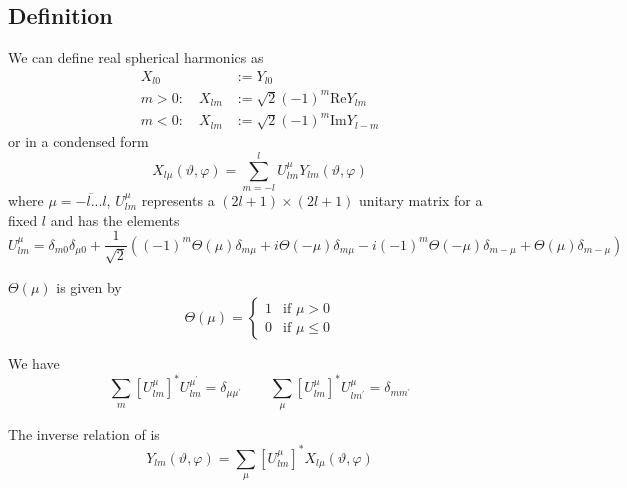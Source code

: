 \subsection{Definition}
\par{We can define real spherical harmonics as}
\begin{equation}
\begin{split}
X_{l0}&:=Y_{l0}\\ m>0:\quad
X_{lm}&:=\sqrt{2}(-1)^m\text{Re}Y_{lm}\\m<0:\quad X_{lm}&:=\sqrt{2}(-1)^m\text{Im}Y_{l-m}
\end{split}\end{equation}
or in a condensed form
\begin{equation}
\label{Rspherdef}
X_{l\mu}(\vartheta,\varphi)=\sum_{m=-l}^{l}U_{lm}^{\mu}Y_{lm}(\vartheta,\varphi)
\end{equation}
where $\mu=\overline{-l...l}$, $U_{lm}^{\mu}$ represents a $(2l+1)\times (2l+1)$
unitary matrix for a fixed $l$ and has the
elements
\begin{equation*}
U_{lm}^{\mu}=\delta_{m0}\delta_{\mu 0}+\frac{1}{\sqrt{2}}\left((-1)^m
  \Theta(\mu)\delta_{m\mu}+i\Theta(-\mu)\delta_{m\mu}-i(-1)^m \Theta(-\mu)\delta_{m-\mu}+\Theta(\mu)\delta_{m-\mu}\right)
\end{equation*}
\par{$\Theta(\mu)$} is given by
\begin{equation}
\Theta(\mu)=\left\{\begin{array}{ll}
1&\textrm{if \(\mu>0\)}\\
0&\textrm{if \(\mu \le 0\)}
\end{array}\right.
\end{equation}
%
\par{We have}
\begin{equation}
\label{unit}
\sum_{m}[U_{lm}^{\mu}]^{*}U_{lm}^{\mu^{\prime}}=\delta_{\mu \mu^{\prime}}\qquad\sum_{\mu}[U_{lm}^{\mu}]^{*}U_{lm^{\prime}}^{\mu}=\delta_{m m^{\prime}}
\end{equation}
\par{The inverse relation of  is}
\begin{equation}
Y_{lm}(\vartheta,\varphi)=\sum_{\mu}[U_{lm}^{\mu}]^{*}X_{l\mu}(\vartheta,\varphi)
\end{equation}
